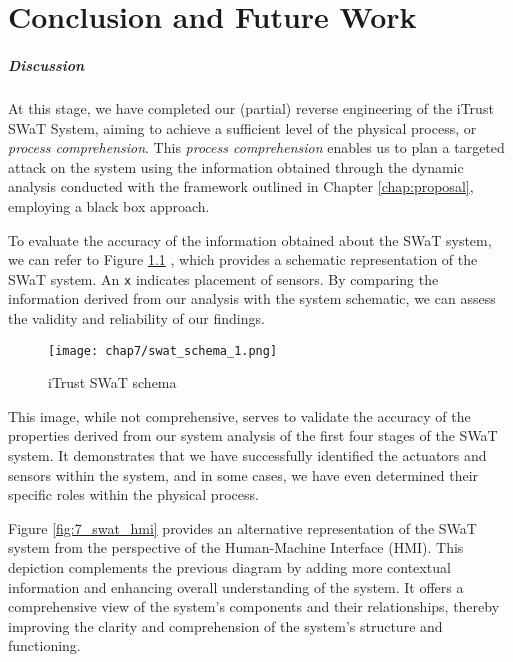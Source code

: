 \chapter{Conclusion and Future Work}
\label{conclusions}
\linenumbers

\paragraph{Discussion}
\label{par:7_discussion}
At this stage, we have completed our (partial) reverse engineering of the iTrust SWaT System, aiming to achieve a sufficient level of the physical process, or \textit{process comprehension}. This \textit{process comprehension} enables us to plan a targeted attack on the system using the information obtained through the dynamic analysis conducted with the framework outlined in Chapter \ref{chap:proposal}, employing a black box approach.

To evaluate the accuracy of the information obtained about the SWaT system, we can refer to Figure \ref{fig:7_swat_schema} \cite{swat_tecnical_pdf}, which provides a schematic representation of the SWaT system. An \texttt{x} indicates placement of sensors. By comparing the information derived from our analysis with the system schematic, we can assess the validity and reliability of our findings.

\begin{figure}[ht]
	\centering
	\texttt{[image: chap7/swat\_schema\_1.png]}
	\caption{iTrust SWaT schema}
	\label{fig:7_swat_schema}
\end{figure}

\bigskip
This image, while not comprehensive, serves to validate the accuracy of the properties derived from our system analysis of the first four stages of the SWaT system. It demonstrates that we have successfully identified the actuators and sensors within the system, and in some cases, we have even determined their specific roles within the physical process.

\bigskip
Figure \ref{fig:7_swat_hmi} \cite{swat_tecnical_pdf} provides an alternative representation of the SWaT system from the perspective of the Human-Machine Interface (HMI). This depiction complements the previous diagram by adding more contextual information and enhancing overall understanding of the system. It offers a comprehensive view of the system's components and their relationships, thereby improving the clarity and comprehension of the system's structure and functioning.

